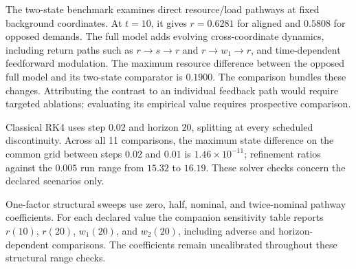 The two-state benchmark examines direct resource/load pathways at fixed background coordinates. At $t=10$, it gives $r=0.6281$ for aligned and $0.5808$ for opposed demands. The full model adds evolving cross-coordinate dynamics, including return paths such as $r\to s\to r$ and $r\to w_1\to r$, and time-dependent feedforward modulation. The maximum resource difference between the opposed full model and its two-state comparator is $0.1900$. The comparison bundles these changes. Attributing the contrast to an individual feedback path would require targeted ablations; evaluating its empirical value requires prospective comparison.

Classical RK4 uses step $0.02$ and horizon $20$, splitting at every scheduled discontinuity. Across all 11 comparisons, the maximum state difference on the common grid between steps $0.02$ and $0.01$ is $1.46\times10^{-11}$; refinement ratios against the $0.005$ run range from $15.32$ to $16.19$. These solver checks concern the declared scenarios only.

One-factor structural sweeps use zero, half, nominal, and twice-nominal pathway coefficients. For each declared value the companion sensitivity table reports $r(10)$, $r(20)$, $w_1(20)$, and $w_2(20)$, including adverse and horizon-dependent comparisons. The coefficients remain uncalibrated throughout these structural range checks.
